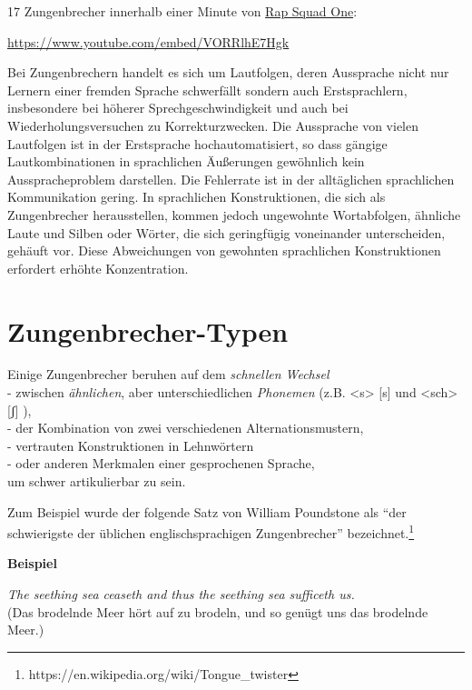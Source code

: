 \documentclass[
  letterpaper,
]{scrbook}
\begin{document}
17 Zungenbrecher innerhalb einer Minute von
\href{https://www.youtube.com/watch?v=VORRlhE7Hgk}{Rap Squad One}:

\url{https://www.youtube.com/embed/VORRlhE7Hgk}

Bei Zungenbrechern handelt es sich um Lautfolgen, deren Aussprache nicht
nur Lernern einer fremden Sprache schwerfällt sondern auch
Erstsprachlern, insbesondere bei höherer Sprechgeschwindigkeit und auch
bei Wiederholungsversuchen zu Korrekturzwecken. Die Aussprache von
vielen Lautfolgen ist in der Erstsprache hochautomatisiert, so dass
gängige Lautkombinationen in sprachlichen Äußerungen gewöhnlich kein
Ausspracheproblem darstellen. Die Fehlerrate ist in der alltäglichen
sprachlichen Kommunikation gering. In sprachlichen Konstruktionen, die
sich als Zungenbrecher herausstellen, kommen jedoch ungewohnte
Wortabfolgen, ähnliche Laute und Silben oder Wörter, die sich
geringfügig voneinander unterscheiden, gehäuft vor. Diese Abweichungen
von gewohnten sprachlichen Konstruktionen erfordert erhöhte
Konzentration.

\hypertarget{zungenbrecher-typen}{%
\section{Zungenbrecher-Typen}\label{zungenbrecher-typen}}

Einige Zungenbrecher beruhen auf dem \emph{schnellen Wechsel}\\
- zwischen \emph{ähnlichen}, aber unterschiedlichen \emph{Phonemen}
(z.B. \textless s\textgreater{} {[}s{]} und \textless sch\textgreater{}
{[}ʃ{]} ),\\
- der Kombination von zwei verschiedenen Alternationsmustern,\\
- vertrauten Konstruktionen in Lehnwörtern\\
- oder anderen Merkmalen einer gesprochenen Sprache,\\
um schwer artikulierbar zu sein.

Zum Beispiel wurde der folgende Satz von William Poundstone als ``der
schwierigste der üblichen englischsprachigen Zungenbrecher''
bezeichnet.\footnote{https://en.wikipedia.org/wiki/Tongue\_twister}

\begin{tcolorbox}[enhanced jigsaw, rightrule=.15mm, arc=.35mm, breakable, colframe=quarto-callout-note-color-frame, left=2mm, colback=white, bottomrule=.15mm, toprule=.15mm, leftrule=.75mm, opacityback=0]
\begin{minipage}[t]{5.5mm}
\textcolor{quarto-callout-note-color}{\faInfo}
\end{minipage}%
\begin{minipage}[t]{\textwidth - 5.5mm}

\textbf{Beispiel}\vspace{2mm}

\emph{The seething sea ceaseth and thus the seething sea sufficeth
us.}\\
(Das brodelnde Meer hört auf zu brodeln, und so genügt uns das brodelnde
Meer.)

\end{minipage}%
\end{tcolorbox}
\end{document}
